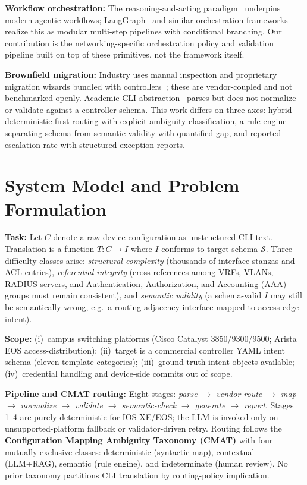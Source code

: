 \documentclass[conference]{IEEEtran}
\begin{document}
\textbf{Workflow orchestration:} The reasoning-and-acting paradigm~\cite{yao2023react} underpins modern agentic workflows; LangGraph~\cite{langchain2024langgraph} and similar orchestration frameworks~\cite{wu2023autogen} realize this as modular multi-step pipelines with conditional branching. Our contribution is the networking-specific orchestration policy and validation pipeline built on top of these primitives, not the framework itself.

\textbf{Brownfield migration:} Industry uses manual inspection and proprietary migration wizards bundled with controllers~\cite{leivadeas2023survey,juniper2023apstra}; these are vendor-coupled and not benchmarked openly. Academic CLI abstraction~\cite{martinez2015cli} parses but does not normalize or validate against a controller schema. This work differs on three axes: hybrid deterministic-first routing with explicit ambiguity classification, a rule engine separating schema from semantic validity with quantified gap, and reported escalation rate with structured exception reports.

\section{System Model and Problem Formulation}

\textbf{Task:} Let $C$ denote a raw device configuration as unstructured CLI text. Translation is a function $T: C \rightarrow I$ where $I$ conforms to target schema $\mathcal{S}$. Three difficulty classes arise: \emph{structural complexity} (thousands of interface stanzas and ACL entries), \emph{referential integrity} (cross-references among VRFs, VLANs, RADIUS servers, and Authentication, Authorization, and Accounting (AAA) groups must remain consistent), and \emph{semantic validity} (a schema-valid $I$ may still be semantically wrong, e.g.\ a routing-adjacency interface mapped to access-edge intent).

\textbf{Scope:} (i)~campus switching platforms (Cisco Catalyst 3850/9300/9500; Arista EOS access-distribution); (ii)~target is a commercial controller YAML intent schema (eleven template categories); (iii)~ground-truth intent objects available; (iv)~credential handling and device-side commits out of scope.

\textbf{Pipeline and CMAT routing:} Eight stages: \emph{parse $\rightarrow$ vendor-route $\rightarrow$ map $\rightarrow$ normalize $\rightarrow$ validate $\rightarrow$ semantic-check $\rightarrow$ generate $\rightarrow$ report}. Stages 1--4 are purely deterministic for IOS-XE/EOS; the LLM is invoked only on unsupported-platform fallback or validator-driven retry. Routing follows the \textbf{Configuration Mapping Ambiguity Taxonomy (CMAT)} with four mutually exclusive classes: deterministic (syntactic map), contextual (LLM+RAG), semantic (rule engine), and indeterminate (human review). No prior taxonomy partitions CLI translation by routing-policy implication.
\end{document}
